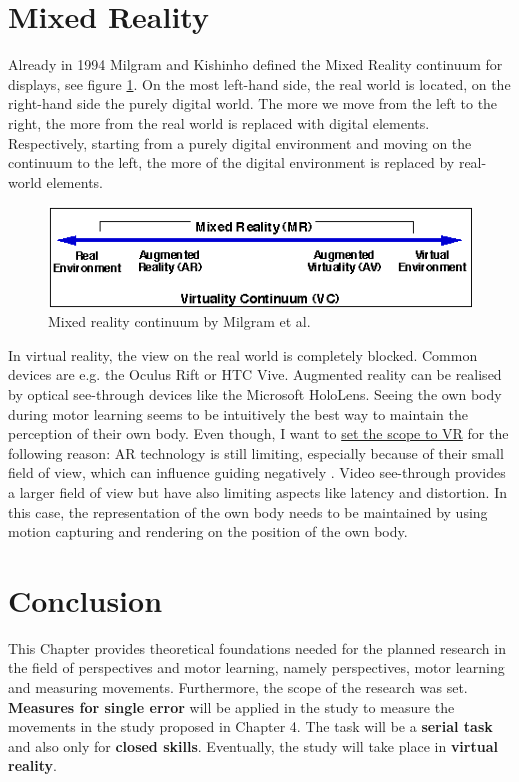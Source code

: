 \section{Mixed Reality}
Already in 1994 Milgram and Kishinho \cite{Milgram1994} defined the Mixed Reality continuum for displays, see figure \ref{fig:MRcont}. On the most left-hand side, the real world is located, on the right-hand side the purely digital world. The more we move from the left to the right, the more from the real world is replaced with digital elements. Respectively, starting from a purely digital environment and moving on the continuum to the left, the more of the digital environment is replaced by real-world elements.
\begin{figure}
	\centering
	\includegraphics[width=1.0\textwidth]{img/milgram_continuum.png}
	\caption{Mixed reality continuum by Milgram et al. \cite{Milgram1994}}
	\label{fig:MRcont}
\end{figure}
In virtual reality, the view on the real world is completely blocked. Common devices are e.g. the Oculus Rift or HTC Vive. Augmented reality can be realised by optical see-through devices like the Microsoft HoloLens. Seeing the own body during motor learning seems to be intuitively the best way to maintain the perception of their own body. Even though, I want to \ul{set the scope to VR} for the following reason: AR technology is still limiting, especially because of their small field of view, which can influence guiding negatively \cite{Katzakis2017}. Video see-through provides a larger field of view but have also limiting aspects like latency and distortion. In this case, the representation of the own body needs to be maintained by using motion capturing and rendering on the position of the own body.


\section{Conclusion}
This Chapter provides theoretical foundations needed for the planned research in the field of perspectives and motor learning, namely perspectives, motor learning and measuring movements. Furthermore, the scope of the research was set. \textbf{Measures for single error} will be applied in the study to measure the movements in the study proposed in Chapter 4. The task will be a \textbf{serial task} and also only for \textbf{closed skills}. Eventually, the study will take place in \textbf{virtual reality}.